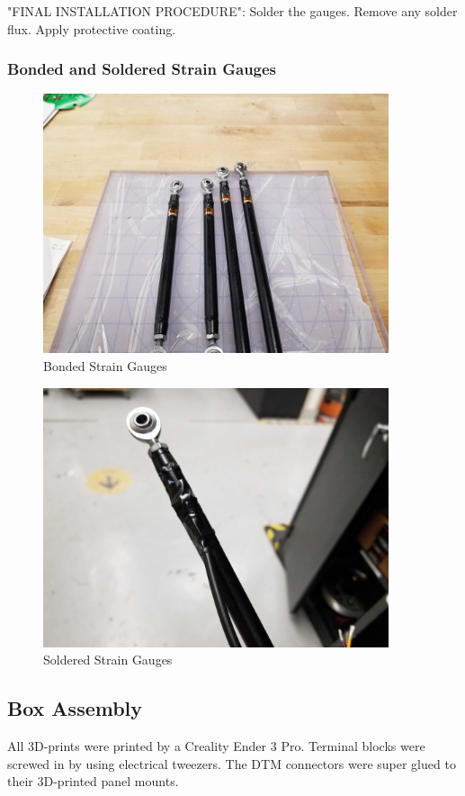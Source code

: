 "FINAL INSTALLATION PROCEDURE":
Solder the gauges. 
Remove any solder flux. 
Apply protective coating.


\subsubsection{Bonded and Soldered Strain Gauges}
\begin{figure}[H]
        \centering
        \includegraphics[width=4in]{images/Strain Gauge/straingauge-noleads.jpg}
        \caption{Bonded Strain Gauges}
        \label{fig:straingauge-noleads}
\end{figure}

\begin{figure}[H]
        \centering
        \includegraphics[width=4in]{images/Strain Gauge/straingauge.jpg}
        \caption{Soldered Strain Gauges}
        \label{fig:Soldered Strain Gauges}
\end{figure}


\subsection{Box Assembly}
All 3D-prints were printed by a Creality Ender 3 Pro.
Terminal blocks were screwed in by using electrical tweezers.
The DTM connectors were super glued to their 3D-printed panel mounts.